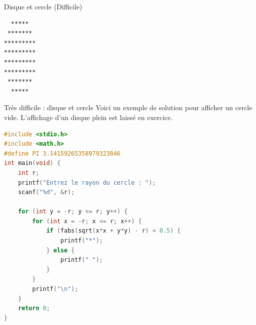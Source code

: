 \begin{UPSTIexercice}{Disque et cercle (Difficile)}
    \begin{verbatim}
  *****
 *******
*********
*********
*********
*********
 *******
  *****
    \end{verbatim}
\end{UPSTIexercice}

\begin{UPSTIprofOnlyEnv}
    \begin{UPSTIcorrectionP}{Très difficile : disque et cercle}
        Voici un exemple de solution pour afficher un cercle vide. L'affichage d'un disque plein est laissé en exercice.
        \begin{lstlisting}[language=C]
#include <stdio.h>
#include <math.h>
#define PI 3.14159265358979323846
int main(void) {
    int r;
    printf("Entrez le rayon du cercle : ");
    scanf("%d", &r);

    for (int y = -r; y <= r; y++) {
        for (int x = -r; x <= r; x++) {
            if (fabs(sqrt(x*x + y*y) - r) < 0.5) {
                printf("*");
            } else {
                printf(" ");
            }
        }
        printf("\n");
    }
    return 0;
}
        \end{lstlisting}
    \end{UPSTIcorrectionP}
\end{UPSTIprofOnlyEnv}
